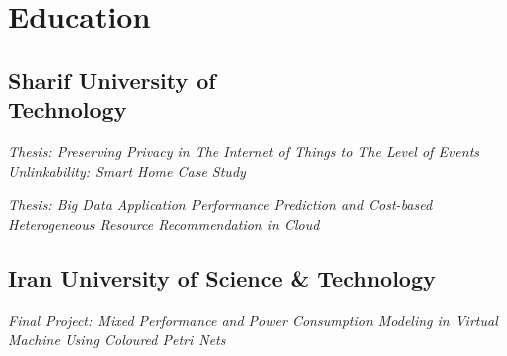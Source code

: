 \documentclass[letterpaper]{deedy-resume} %
\begin{document}
\begin{minipage}[t]{0.33\textwidth} %


\section{Education} 

\subsection{Sharif University of \\ Technology}

{\footnotesize \textit{Thesis: Preserving Privacy in The Internet of Things to The Level of Events Unlinkability: Smart Home Case Study }} \\

\sectionspace %

{\footnotesize \textit{Thesis: Big Data Application Performance Prediction and Cost-based Heterogeneous Resource Recommendation in Cloud}} \\

\sectionspace %


\subsection{Iran University of Science \& Technology}

{\footnotesize \textit{Final Project: Mixed Performance and Power Consumption Modeling in Virtual Machine Using Coloured Petri Nets}} \\

\sectionspace %



\end{minipage}
\end{document}
